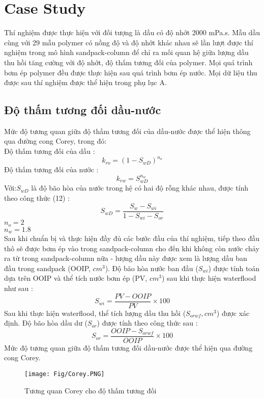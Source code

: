 \documentclass[12pt,a4paper]{article}
\begin{document}
\section{Case Study}
	Thí nghiệm được thực hiện với đối tượng là dầu có độ nhớt 2000 mPa.s. Mẫu dầu cùng với 29 mẫu polymer có nồng độ và độ nhớt khác nhau sẽ lần lượt được thí nghiệm trong mô hình sandpack-column để chỉ ra mối quan hệ giữa lượng dầu thu hồi tăng cường với độ nhớt, độ thấm tương đối của polymer. Mọi quá trình bơm ép polymer đều được thực hiện sau quá trình bơm ép nước. Mọi dữ liệu thu được sau thí nghiệm được thể hiện trong phụ lục A.
	\subsection{Độ thấm tương đối dầu-nước}
	Mức độ tương quan giữa độ thấm tương đối của dầu-nước được thể hiện thông qua đường cong Corey, trong đó:\\
	Độ thấm tương đối của dầu \cite{guliyev2008simulation}:
		\begin{equation}
			k_{ro}=(1-S_{wD})^{n_o}
		\end{equation}
	Độ thấm tương đối của nước \cite{guliyev2008simulation}:
		\begin{equation}
			k_{rw}=S_{wD}^{n_w}
		\end{equation}
	Với:\hspace*{15pt}$S_{wD}$ là độ bão hòa của nước trong hệ có hai độ rỗng khác nhau, được tính theo công thức (12) \cite{guliyev2008simulation}:
		\begin{equation}
			S_{wD}=\frac{S_w-S_{wi}}{1-S_{wi}-S_{or}}
		\end{equation}
	\hspace*{37pt}$n_o=2$\\
	\hspace*{37pt}$n_w=1.8$\\
	Sau khi chuẩn bị và thực hiện đầy đủ các bước đầu của thí nghiệm, tiếp theo đầu thô sẽ được bơm ép vào trong sandpack-column cho đến khi không còn nước chảy ra từ trong sandpack-column nữa - lượng dầu này được xem là lượng dầu ban đầu trong sandpack (OOIP, $cm^3$). Độ bão hòa nước ban đầu ($S_{wi}$) được tính toán dựa trên OOIP và thể tích nước bơm ép (PV, $cm^3$) sau khi thực hiện waterflood như sau \cite{pereira2014ionic}:
		\begin{equation}
			S_{wi}=\frac{PV-OOIP}{PV}\times{100}
		\end{equation}
	\newpage
	\noindent
	Sau khi thực hiện waterflood, thể tích lượng dầu thu hồi ($S_{orwf}, cm^3$) được xác định. Độ bão hòa dầu dư ($S_{or}$) được tính theo công thức sau \cite{pereira2014ionic}:
		\begin{equation}
		S_{or}=\frac{OOIP-S_{orwf}}{OOIP}\times{100}
		\end{equation}
	Mức độ tương quan giữa độ thấm tương đối dầu-nước được thể hiện qua đường cong Corey.
		\begin{figure}[h]
			\centering
			\texttt{[image: Fig/Corey.PNG]}
			\caption{Tương quan Corey cho độ thấm tương đối}
		\end{figure}
	\newpage
\end{document}
